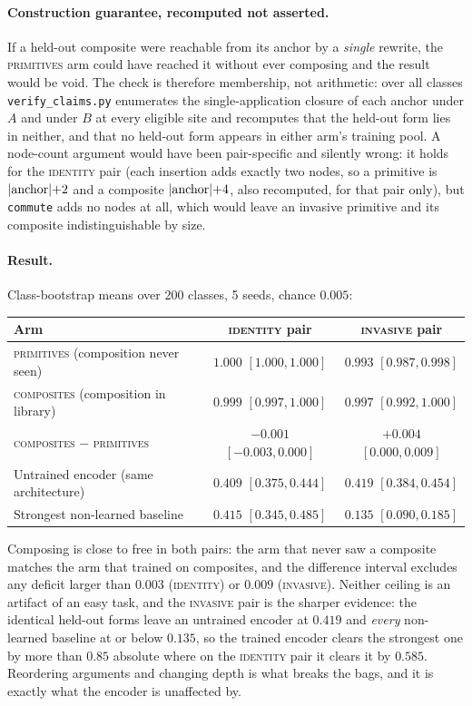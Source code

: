 \paragraph{Construction guarantee, recomputed not asserted.} If a held-out composite were reachable from its anchor by a \emph{single} rewrite, the \textsc{primitives} arm could have reached it without ever composing and the result would be void. The check is therefore membership, not arithmetic: over all classes \texttt{verify\_claims.py} enumerates the single-application closure of each anchor under $A$ and under $B$ at every eligible site and recomputes that the held-out form lies in neither, and that no held-out form appears in either arm's training pool. A node-count argument would have been pair-specific and silently wrong: it holds for the \textsc{identity} pair (each insertion adds exactly two nodes, so a primitive is $|{\rm anchor}|{+}2$ and a composite $|{\rm anchor}|{+}4$, also recomputed, for that pair only), but \texttt{commute} adds no nodes at all, which would leave an invasive primitive and its composite indistinguishable by size.

\paragraph{Result.} Class-bootstrap means over 200 classes, 5 seeds, chance $0.005$:
\begin{center}\small
\begin{tabular}{lcc}
\toprule
Arm & \textsc{identity} pair & \textsc{invasive} pair \\
\midrule
\textsc{primitives} (composition never seen) & $1.000$ $[1.000, 1.000]$ & $0.993$ $[0.987, 0.998]$ \\
\textsc{composites} (composition in library) & $0.999$ $[0.997, 1.000]$ & $0.997$ $[0.992, 1.000]$ \\
\textsc{composites} $-$ \textsc{primitives} & $-0.001$ $[-0.003, 0.000]$ & $+0.004$ $[0.000, 0.009]$ \\
\midrule
Untrained encoder (same architecture) & $0.409$ $[0.375, 0.444]$ & $0.419$ $[0.384, 0.454]$ \\
Strongest non-learned baseline & $0.415$ $[0.345, 0.485]$ & $0.135$ $[0.090, 0.185]$ \\
\bottomrule
\end{tabular}
\end{center}
Composing is close to free in both pairs: the arm that never saw a composite matches the arm that trained on composites, and the difference interval excludes any deficit larger than $0.003$ (\textsc{identity}) or $0.009$ (\textsc{invasive}). Neither ceiling is an artifact of an easy task, and the \textsc{invasive} pair is the sharper evidence: the identical held-out forms leave an untrained encoder at $0.419$ and \emph{every} non-learned baseline at or below $0.135$, so the trained encoder clears the strongest one by more than $0.85$ absolute where on the \textsc{identity} pair it clears it by $0.585$. Reordering arguments and changing depth is what breaks the bags, and it is exactly what the encoder is unaffected by.

